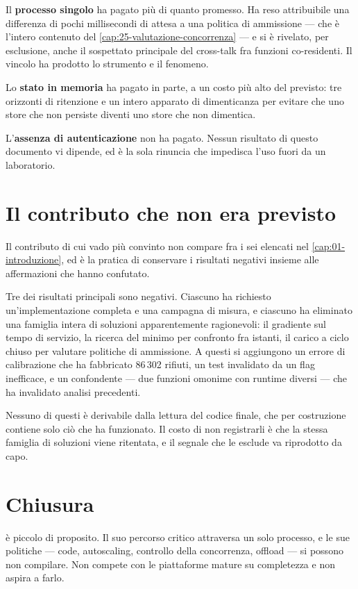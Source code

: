 Il \textbf{processo singolo} ha pagato pi\`u di quanto promesso. Ha reso
attribuibile una differenza di pochi millisecondi di attesa a una politica di
ammissione --- che \`e l'intero contenuto del \cref{cap:25-valutazione-concorrenza}
--- e si \`e rivelato, per esclusione, anche il sospettato principale del
cross-talk fra funzioni co-residenti. Il vincolo ha prodotto lo strumento e il
fenomeno.

Lo \textbf{stato in memoria} ha pagato in parte, a un costo pi\`u alto del
previsto: tre orizzonti di ritenzione e un intero apparato di dimenticanza per
evitare che uno store che non persiste diventi uno store che non dimentica.

L'\textbf{assenza di autenticazione} non ha pagato. Nessun risultato di questo
documento vi dipende, ed \`e la sola rinuncia che impedisca l'uso fuori da un
laboratorio.

\section{Il contributo che non era previsto}

Il contributo di cui vado pi\`u convinto non compare fra i sei elencati nel
\cref{cap:01-introduzione}, ed \`e la pratica di conservare i risultati negativi
insieme alle affermazioni che hanno confutato.

Tre dei risultati principali sono negativi. Ciascuno ha richiesto
un'implementazione completa e una campagna di misura, e ciascuno ha eliminato una
famiglia intera di soluzioni apparentemente ragionevoli: il gradiente sul tempo
di servizio, la ricerca del minimo per confronto fra istanti, il carico a ciclo
chiuso per valutare politiche di ammissione. A questi si aggiungono un errore di
calibrazione che ha fabbricato 86\,302 rifiuti, un test invalidato da un flag
inefficace, e un confondente --- due funzioni omonime con runtime diversi ---
che ha invalidato analisi precedenti.

Nessuno di questi \`e derivabile dalla lettura del codice finale, che per
costruzione contiene solo ci\`o che ha funzionato. Il costo di non registrarli \`e
che la stessa famiglia di soluzioni viene ritentata, e il segnale che le esclude
va riprodotto da capo.

\section{Chiusura}

\nf{} \`e piccolo di proposito. Il suo percorso critico attraversa un solo
processo, e le sue politiche --- code, autoscaling, controllo della concorrenza,
offload --- si possono non compilare. Non compete con le piattaforme mature su completezza e
non aspira a farlo.

